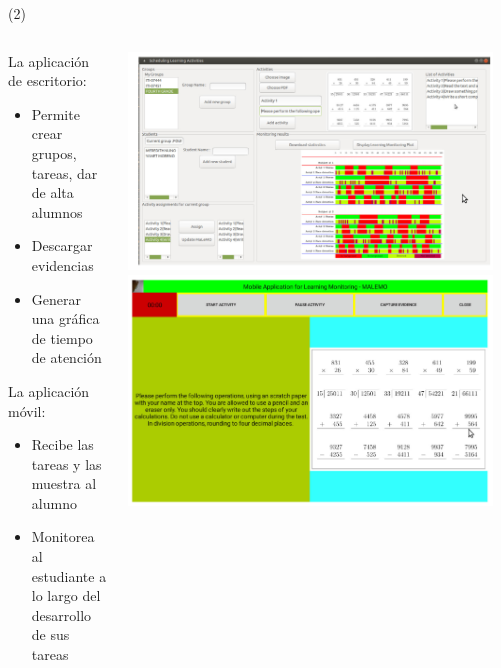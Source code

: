 \begin{frame}{ (2)}


\begin{columns}
\begin{column}{0.65\textwidth}
\begin{block}{La aplicación de escritorio:} 
		\begin{itemize}
		\item Permite crear grupos, tareas, dar de alta alumnos
		\item Descargar evidencias
		\item Generar una gráfica de tiempo de atención
		\end{itemize}
\end{block} 
\begin{block}{La aplicación móvil:} 
		\begin{itemize}
		\item Recibe las tareas y las muestra al alumno
		\item Monitorea al estudiante a lo largo del desarrollo de sus tareas
		\end{itemize}
\end{block} 
\end{column}
\begin{column}{0.35\textwidth}  
    \begin{center}
     \includegraphics[width=0.95\textwidth]{Figs/LearningMonitoring1}
     \includegraphics[width=0.95\textwidth]{Figs/LearningMonitoring2}
     \end{center}
\end{column}
\end{columns}



\end{frame}
